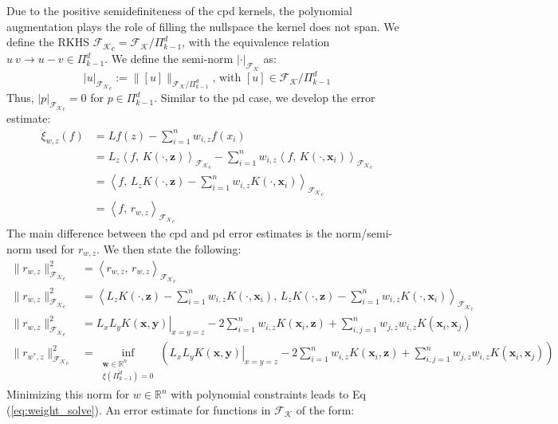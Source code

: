 \documentclass[11pt]{article}
\begin{document}
Due to the positive semidefiniteness of the cpd kernels, the polynomial augmentation plays the role of filling the nullspace the kernel does not span. We define the RKHS $\mathcal{F_K}_c = \mathcal{F_K} / \Pi_{k-1}^d$, with the equivalence relation $u ~ v \rightarrow u-v \in \Pi_{k-1}^d$. We define the semi-norm $| \cdot |_{\mathcal{F_K}}$ as:
\begin{equation}
	\left | u \right |_{\mathcal{F_K}_c} := \| [u] \|_{\mathcal{F_K} / \Pi_{k-1}^d} \text{, with } [u] \in \mathcal{F_K} / \Pi_{k-1}^d
\end{equation}
Thus, $| p |_{\mathcal{F_K}_c} = 0$ for $p \in \Pi_{k-1}^d$. Similar to the pd case, we develop the error estimate:
\begin{align*}
	\xi_{w,z}(f) &= Lf(z) - \sum_{i=1}^n w_{i,z} f(x_i)\\
	&= L_z \left \langle f, \, K(\cdot, \bm{z}) \right \rangle_{\mathcal{F_K}_c} - \sum_{i=1}^n w_{i,z} \left \langle f, \, K(\cdot, \bm{x}_i) \right \rangle_{\mathcal{F_K}_c}\\
	&= \left \langle f, \, L_z K(\cdot, \bm{z}) - \sum_{i=1}^n w_{i,z} K(\cdot, \bm{x}_i) \right \rangle_{\mathcal{F_K}_c}\\
	&= \left \langle f, \, r_{w,z} \right \rangle_{\mathcal{F_K}_c}
\end{align*}
The main difference between the cpd and pd error estimates is the norm/semi-norm used for $r_{w,z}$. We then state the following:
\begin{align*}
	\| r_{w,z} \|_{\mathcal{F_K}_c}^2 &= \left \langle r_{w,z}, \, r_{w,z} \right \rangle_{\mathcal{F_K}_c}\\
	\| r_{w,z} \|_{\mathcal{F_K}_c}^2 &= \left \langle L_z K(\cdot, \bm{z}) - \sum_{i=1}^n w_{i,z} K(\cdot, \bm{x}_i), \, L_z K(\cdot, \bm{z}) - \sum_{i=1}^n w_{i,z} K(\cdot, \bm{x}_i) \right \rangle_{\mathcal{F_K}_c}\\
	\| r_{w,z} \|_{\mathcal{F_K}_c}^2 &= \left. L_x L_y K(\bm{x}, \bm{y}) \right|_{x=y=z} - 2 \sum_{i=1}^n w_{i,z} K(\bm{x}_i, \bm{z}) + \sum_{i,j=1}^n w_{j,z} w_{i,z} K(\bm{x}_i, \bm{x}_j)\\
	\| r_{w^*,z} \|_{\mathcal{F_K}_c}^2 &= \inf_{\substack{\bm{w}\in \mathbb{R}^n \\ \xi (\Pi_{k-1}^d) = 0}} \left ( \left. L_x L_y K(\bm{x}, \bm{y}) \right|_{x=y=z} - 2 \sum_{i=1}^n w_{i,z} K(\bm{x}_i, \bm{z}) + \sum_{i,j=1}^n w_{j,z} w_{i,z} K(\bm{x}_i, \bm{x}_j) \right)
\end{align*}
Minimizing this norm for $w \in \mathbb{R}^n$ with polynomial constraints leads to Eq (\ref{eq:weight_solve}). An error estimate for functions in $\mathcal{F_K}$ of the form:
\end{document}
